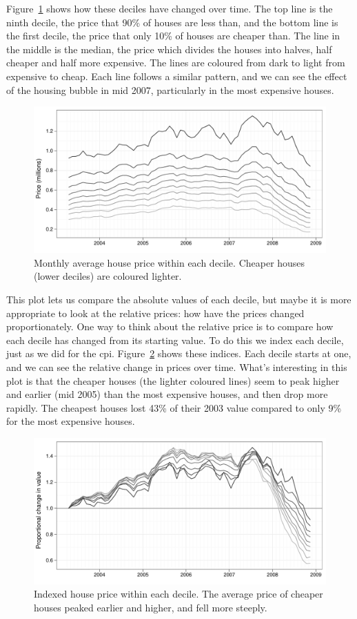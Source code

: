 \documentclass[oneside]{article}
\begin{document}
Figure~\ref{fig:decile-raw} shows how these deciles have changed over time.  The top line is the ninth decile, the price that 90\% of houses are less than, and the bottom line is the first decile, the price that only 10\% of houses are cheaper than.  The line in the middle is the median, the price which divides the houses into halves, half cheaper and half more expensive.  The lines are coloured from dark to light from expensive to cheap.  Each line follows a similar pattern, and we can see the effect of the housing bubble in mid 2007, particularly in the most expensive houses.  

\begin{figure}[htbp]
  \centering
  \includegraphics[width=0.75\linewidth]{decile-raw}
  \caption{Monthly average house price within each decile.  Cheaper houses (lower deciles) are coloured lighter.} 
  \label{fig:decile-raw}
\end{figure}

This plot lets us compare the absolute values of each decile, but maybe it is more appropriate to look at the relative prices: how have the prices changed proportionately.  One way to think about the relative price is to compare how each decile has changed from its starting value.  To do this we index each decile, just as we did for the {\sc cpi}. Figure~\ref{fig:decile-ind} shows these indices.  Each decile starts at one, and we can see the relative change in prices over time.  What's interesting in this plot is that the cheaper houses (the lighter coloured lines) seem to peak higher and earlier (mid 2005) than the most expensive houses, and then drop more rapidly.  The cheapest houses lost 43\% of their 2003 value compared to only 9\% for the most expensive houses.

\begin{figure}[htbp]
  \centering
  \includegraphics[width=0.75\linewidth]{decile-ind}
  \caption{Indexed house price within each decile.  The average price of cheaper houses peaked earlier and higher, and fell more steeply.}
  \label{fig:decile-ind}
\end{figure}
\end{document}
